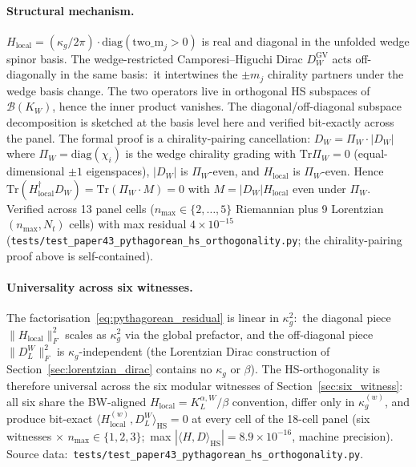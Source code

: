 \documentclass[11pt,a4paper]{article}
\theoremstyle{plain}
\theoremstyle{definition}
\newcommand{\nmax}{n_{\max}}
\newcommand{\Nt}{N_t}
\newcommand{\Tr}{\mathrm{Tr}}
\newcommand{\DL}{D_{L}}
\newcommand{\KL}{K_{L}}
\begin{document}
\paragraph{Structural mechanism.}
$H_{\mathrm{local}} = (\kappa_g / 2\pi) \cdot
\mathrm{diag}(\mathrm{two\_m}_j > 0)$ is real and diagonal in the
unfolded wedge spinor basis. The wedge-restricted Camporesi--Higuchi
Dirac $D_W^{\mathrm{GV}}$ acts off-diagonally in the same basis:\
it intertwines the $\pm m_j$ chirality partners under the wedge
basis change. The two operators live in orthogonal HS subspaces of
$\mathcal{B}(K_W)$, hence the inner product vanishes. The
diagonal/off-diagonal subspace decomposition is sketched at the
basis level here and verified bit-exactly across the panel.
The formal proof is a chirality-pairing cancellation:
$D_W = \Pi_W \cdot |D_W|$ where
$\Pi_W = \mathrm{diag}(\chi_i)$ is the wedge chirality grading
with $\Tr \Pi_W = 0$ (equal-dimensional $\pm 1$ eigenspaces),
$|D_W|$ is $\Pi_W$-even, and $H_{\mathrm{local}}$ is
$\Pi_W$-even.  Hence
$\Tr(H_{\mathrm{local}}^\dagger D_W)
= \Tr(\Pi_W \cdot M) = 0$ with $M = |D_W| H_{\mathrm{local}}$
even under $\Pi_W$.  Verified across 13 panel cells
($\nmax \in \{2, \ldots, 5\}$ Riemannian plus 9 Lorentzian
$(\nmax, \Nt)$ cells) with max residual $4 \times 10^{-15}$
(\texttt{tests/test\_paper43\_pythagorean\_hs\_orthogonality.py}; the
chirality-pairing proof above is self-contained).

\paragraph{Universality across six witnesses.}
The factorisation~\eqref{eq:pythagorean_residual} is linear in
$\kappa_g^2$:\ the diagonal piece $\|H_{\mathrm{local}}\|_F^2$
scales as $\kappa_g^2$ via the global prefactor, and the
off-diagonal piece $\|\DL^W\|_F^2$ is $\kappa_g$-independent (the
Lorentzian Dirac construction of
Section~\ref{sec:lorentzian_dirac} contains no $\kappa_g$ or
$\beta$). The HS-orthogonality is therefore universal across the
six modular witnesses of Section~\ref{sec:six_witness}: all six
share the BW-aligned $H_{\mathrm{local}} = \KL^{\alpha, W} / \beta$
convention, differ only in $\kappa_g^{(w)}$, and produce bit-exact
$\langle H_{\mathrm{local}}^{(w)}, \DL^W \rangle_{\mathrm{HS}} = 0$
at every cell of the 18-cell panel (six witnesses $\times$
$\nmax \in \{1, 2, 3\}$;\ max
$|\langle H, D \rangle_{\mathrm{HS}}|
= 8.9\times 10^{-16}$, machine precision). Source data:\
\texttt{tests/test\_paper43\_pythagorean\_hs\_orthogonality.py}.
\end{document}
